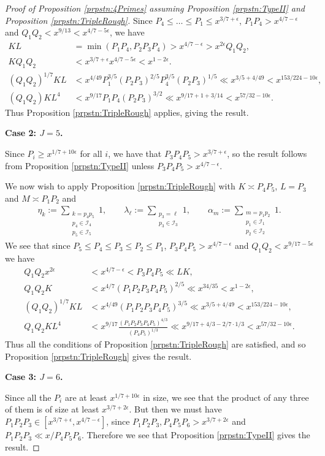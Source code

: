 \documentclass[10pt]{amsart}
\theoremstyle{plain}
\numberwithin{equation}{section}
\begin{document}
\begin{proof}[Proof of Proposition \ref{prpstn:4Primes} assuming Proposition \ref{prpstn:TypeII} and Proposition \ref{prpstn:TripleRough}]
Since $P_4\le \dots \le P_1\le x^{3/7+\epsilon}$, $P_1P_4>x^{4/7-\epsilon}$ and $Q_1Q_2<x^{9/13}<x^{4/7-5\epsilon}$, we have
\begin{align*}
K L&=\min(P_1 P_4,P_2P_3P_4)>x^{4/7-\epsilon}>x^{2\epsilon} Q_1 Q_2,\\
K Q_1Q_2&<x^{3/7+\epsilon}x^{4/7-5\epsilon}<x^{1-2\epsilon}.\\
(Q_1Q_2)^{1/7} K L&<x^{4/49} P_1^{3/5}(P_2P_3)^{2/5}P_4^{3/5} (P_2P_3)^{1/5}\ll x^{3/5+4/49}<x^{153/224-10\epsilon},\\
(Q_1Q_2) K L^{4}&<x^{9/17}P_1P_4(P_2P_3)^{3/2}\ll  x^{9/17+1+3/14}<x^{57/32-10\epsilon}.
\end{align*}
Thus Proposition \ref{prpstn:TripleRough} applies, giving the result.

\medskip

\textbf{Case 2: $J=5$.}

Since $P_i\ge x^{1/7+10\epsilon}$ for all $i$, we have that $P_3P_4P_5>x^{3/7+\epsilon}$, so the result follows from Proposition \ref{prpstn:TypeII} unless $P_3P_4P_5>x^{4/7-\epsilon}$. 

We now wish to apply Proposition \ref{prpstn:TripleRough} with $K\asymp P_4 P_5$, $L=P_3$ and $M\asymp P_1P_2$ and
\begin{align*}
\eta_k:=\sum_{\substack{k=p_4 p_5\\ p_4\in \mathcal{I}_4\\ p_5\in\mathcal{I}_5}}1,\qquad \lambda_\ell:=\sum_{\substack{p_3=\ell\\ p_3\in\mathcal{I}_3}}1,\qquad \alpha_m:=\sum_{\substack{m=p_1p_2\\ p_1\in\mathcal{I}_1\\ p_2\in\mathcal{I}_2}}1.
\end{align*}
We see that since $P_5\le P_4\le P_3\le P_2\le P_1$, $P_3 P_4 P_5>x^{4/7-\epsilon}$ and $Q_1Q_2<x^{9/17-5\epsilon}$ we have
\begin{align*}
Q_1Q_2 x^{2\epsilon}&<x^{4/7-\epsilon}<P_3 P_4 P_5 \ll  L K,\\
Q_1Q_2 K&<x^{4/7}(P_1P_2P_3P_4P_5)^{2/5}\ll x^{34/35}<x^{1-2\epsilon},\\
(Q_1Q_2)^{1/7} K L&<x^{4/49}(P_1P_2P_3P_4P_5)^{3/5}\ll x^{3/5+4/49}<x^{153/224-10\epsilon},\\
Q_1Q_2 K L^{4}&<x^{9/17}\frac{(P_1P_2P_3P_4P_5)^{4/3}}{(P_4P_5)^{1/3}}\ll x^{9/17+4/3-2/7\cdot 1/3}<x^{57/32-10\epsilon}.
\end{align*}
Thus all the conditions of Proposition \ref{prpstn:TripleRough} are satisfied, and so Proposition \ref{prpstn:TripleRough} gives the result.

\medskip

\textbf{Case 3: $J=6$.}

Since all the $P_i$ are at least $x^{1/7+10\epsilon}$ in size, we see that the product of any three of them is of size at least $x^{3/7+2\epsilon}$. But then we must have $P_1P_2P_3\in [x^{3/7+\epsilon},x^{4/7-\epsilon}]$, since $P_1P_2P_3,P_4P_5P_6>x^{3/7+2\epsilon}$ and $P_1P_2P_3\ll x/P_4P_5P_6$. Therefore we see that Proposition \ref{prpstn:TypeII} gives the result.
\end{proof}
\end{document}

